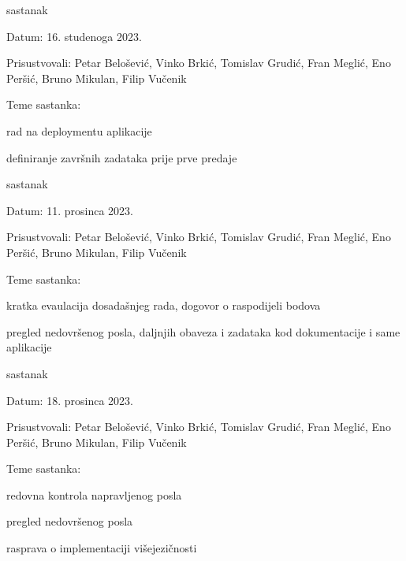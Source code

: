 \begin{packed_enum}
			\item  sastanak
			\item[] \begin{packed_item}
				\item Datum: 16. studenoga 2023.
				\item Prisustvovali: Petar Belošević, Vinko Brkić, Tomislav Grudić, Fran Meglić, Eno Peršić, Bruno Mikulan, Filip Vučenik
				\item Teme sastanka:
				\begin{packed_item}
					\item rad na deploymentu aplikacije
					\item definiranje završnih zadataka prije prve predaje
				\end{packed_item}
			\end{packed_item}
			
			\item  sastanak
			\item[] \begin{packed_item}
				\item Datum: 11. prosinca 2023.
				\item Prisustvovali: Petar Belošević, Vinko Brkić, Tomislav Grudić, Fran Meglić, Eno Peršić, Bruno Mikulan, Filip Vučenik
				\item Teme sastanka:
				\begin{packed_item}
					\item kratka evaulacija dosadašnjeg rada, dogovor o raspodijeli bodova
					\item pregled nedovršenog posla, daljnjih obaveza i zadataka kod dokumentacije i same aplikacije
				\end{packed_item}
			\end{packed_item}
			
			\item  sastanak
			\item[] \begin{packed_item}
				\item Datum: 18. prosinca 2023.
				\item Prisustvovali: Petar Belošević, Vinko Brkić, Tomislav Grudić, Fran Meglić, Eno Peršić, Bruno Mikulan, Filip Vučenik
				\item Teme sastanka:
				\begin{packed_item}
					\item redovna kontrola napravljenog posla
					\item pregled nedovršenog posla
					\item rasprava o implementaciji višejezičnosti
				\end{packed_item}
			\end{packed_item}
			

\end{packed_enum}
